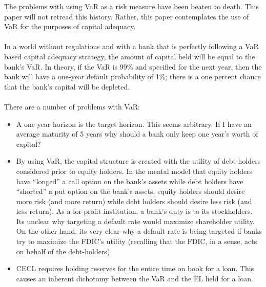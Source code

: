 \documentclass{article}
\begin{document}
The problems with using VaR as a risk measure have been beaten to death.  This paper will not retread this history.  Rather, this paper contemplates the use of VaR for the purposes of capital adequacy.  
\\
\\
In a world without regulations and with a bank that is perfectly following a VaR based capital adequacy strategy, the amount of capital held will be equal to the bank's VaR.  In theory, if the VaR is 99\% and specified for the next year, then the bank will have a one-year default probability of 1\%; there is a one percent chance that the bank's capital will be depleted.  
\\
\\
There are a number of problems with VaR:
\begin{itemize}
\item A one year horizon is the target horizon.  This seems arbitrary.  If I have an average maturity of 5 years why should a bank only keep one year's worth of capital?  
\item By using VaR, the capital structure is created with the utility of debt-holders considered prior to equity holders.  In the mental model that equity holders have ``longed'' a call option on the bank's assets while debt holders have ``shorted'' a put option on the bank's assets, equity holders should desire more risk (and more return) while debt holders should desire less risk (and less return).  As a for-profit institution, a bank's duty is to its stockholders.  Its unclear why targeting a default rate would maximize shareholder utility. On the other hand, its very clear why a default rate is being targeted if banks try to maximize the FDIC's utility (recalling that the FDIC, in a sense, acts on behalf of the debt-holders)
\item CECL requires holding reserves for the entire time on book for a loan.  This causes an inherent dichotomy between the VaR and the EL held for a loan.
\end{itemize}
\end{document}
